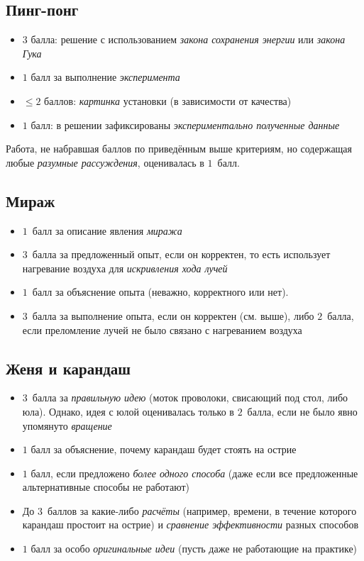 \documentclass[10pt, a4paper, oneside, fleqn]{article}
\newcommand\т{~--- }
\def\le{\leqslant}
\begin{document}
\subsection{Пинг-понг}

\begin{itemize}
\item $3$ балла: решение с использованием \emph{закона сохранения энергии} или \emph{закона Гука}
\item $1$ балл за выполнение \emph{эксперимента}
\item $\le 2$ баллов: \emph{картинка} установки (в зависимости от качества)
\item $1$ балл: в решении зафиксированы \emph{экспериментально полученные данные}
\end{itemize}

Работа, не набравшая баллов по приведённым выше критериям, но содержащая любые \emph{разумные рассуждения}, оценивалась в $1$~балл.

\subsection{Мираж}

\begin{itemize}
\item $1$~балл за описание явления \emph{миража}
\item $3$~балла за предложенный опыт, если он корректен, то есть использует нагревание воздуха для \emph{искривления хода лучей}
\item $1$~балл за объяснение опыта (неважно, корректного или нет).
\item $3$~балла за выполнение опыта, если он корректен (см. выше), либо $2$~балла, если преломление лучей
не было связано с нагреванием воздуха
\end{itemize}

\subsection{Женя и карандаш}

\begin{itemize}
\item $3$~балла за \emph{правильную идею} (моток проволоки, свисающий под стол, либо юла).
Однако, идея с юлой оценивалась только в $2$~балла, если не было явно упомянуто \emph{вращение}

\item $1$ балл за объяснение, почему карандаш будет стоять на острие

\item $1$ балл, если предложено \emph{более одного способа} (даже если все предложенные альтернативные способы не работают)

\item До $3$~баллов за какие-либо \emph{расчёты} (например, времени, в течение которого карандаш простоит на острие)
и \emph{сравнение эффективности} разных способов

\item $1$ балл за особо \emph{оригинальные идеи} (пусть даже не работающие на практике)
\end{itemize}
\end{document}
